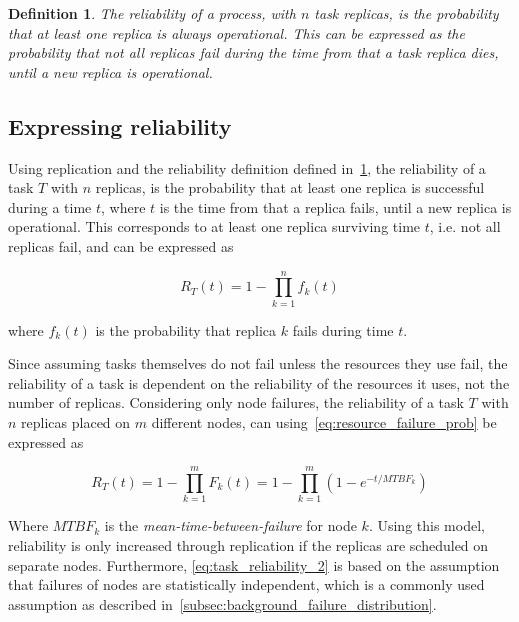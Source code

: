 \documentclass{cslthse-msc}
\newtheorem{definition}{Definition}[chapter]
\begin{document}
\begin{definition} \label{def:task_replica_reliability}
The reliability of a process, with $n$ task replicas, is the probability that at least one replica is always operational. This can be expressed as the probability that not all replicas fail during the time from that a task replica dies, until a new replica is operational.
\end{definition}

\subsection{Expressing reliability}\label{subsec:design_reliability}
Using replication and the reliability definition defined in~\cref{def:task_replica_reliability}, the reliability of a task $T$ with $n$ replicas, is the probability that at least one replica is successful during a time $t$, where $t$ is the time from that a replica fails, until a new replica is operational. This corresponds to at least one replica surviving time $t$, i.e. not all replicas fail, and can be expressed as 

\begin{equation} \label{eq:task_reliability}
R_{T}(t) = 1 - \prod\limits_{k=1}^n f_{k}(t)
\end{equation}

where $f_{k}(t)$ is the probability that replica $k$ fails during time $t$. 

Since assuming tasks themselves do not fail unless the resources they use fail, the reliability of a task is dependent on the reliability of the resources it uses, not the number of replicas. Considering only node failures, the reliability of a task $T$ with $n$ replicas placed on $m$ different nodes, can using~\cref{eq:resource_failure_prob} be expressed as

\begin{equation} \label{eq:task_reliability_2}
R_{T}(t) = 1 - \prod\limits_{k=1}^m F_{k}(t) = 1 - \prod\limits_{k=1}^m (1- e^{-t/MTBF_k})
\end{equation}

Where $MTBF_k$ is the \emph{mean-time-between-failure} for node $k$. Using this model, reliability is only increased through replication if the replicas are scheduled on separate nodes. Furthermore, \cref{eq:task_reliability_2} is based on the assumption that failures of nodes are statistically independent, which is a commonly used assumption as described in~\cref{subsec:background_failure_distribution}.
\end{document}
